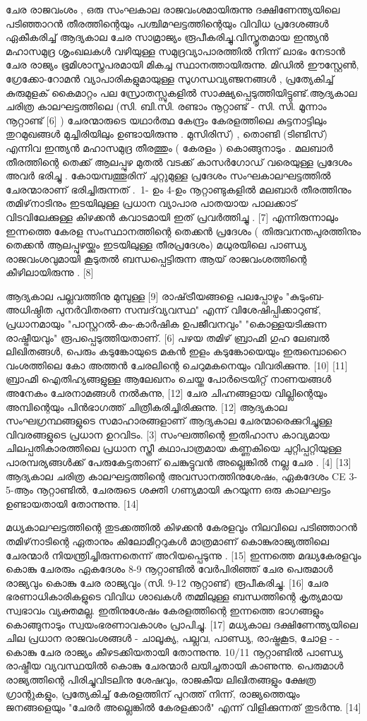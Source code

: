 \documentclass[a4paper,12pt,oneside,final]{article}
\begin{document}
ചേര രാജവംശം , ഒരു സംഘകാല രാജവംശമായിരുന്നു ദക്ഷിണേന്ത്യയിലെ പടിഞ്ഞാറൻ തീരത്തിന്റെയും പശ്ചിമഘട്ടത്തിന്റെയും വിവിധ പ്രദേശങ്ങൾ ഏകീകരിച്ച് ആദ്യകാല ചേര സാമ്രാജ്യം രൂപീകരിച്ചു.വിസ്തൃതമായ ഇന്ത്യൻ മഹാസമുദ്ര ശൃംഖലകൾ വഴിയുള്ള സമുദ്രവ്യാപാരത്തിൽ നിന്ന് ലാഭം നേടാൻ ചേര രാജ്യം ഭൂമിശാസ്ത്രപരമായി മികച്ച സ്ഥാനത്തായിരുന്നു. മിഡിൽ ഈസ്റ്റേൺ, ഗ്രേക്കോ-റോമൻ വ്യാപാരികളുമായുള്ള സുഗന്ധവ്യഞ്ജനങ്ങൾ , പ്രത്യേകിച്ച് കുരുമുളക് കൈമാറ്റം പല സ്രോതസ്സുകളിൽ സാക്ഷ്യപ്പെടുത്തിയിട്ടുണ്ട്.ആദ്യകാല ചരിത്ര കാലഘട്ടത്തിലെ (സി. ബി.സി. രണ്ടാം നൂറ്റാണ്ട് - സി. സി. മൂന്നാം നൂറ്റാണ്ട് [6] ) ചേരന്മാരുടെ യഥാർത്ഥ കേന്ദ്രം കേരളത്തിലെ കുട്ടനാട്ടിലും തുറമുഖങ്ങൾ മുച്ചിരിയിലും ഉണ്ടായിരുന്നു . മുസിരിസ്) , തൊണ്ടി (ടിണ്ടിസ്) എന്നിവ ഇന്ത്യൻ മഹാസമുദ്ര തീരത്തും ( കേരളം ) കൊങ്ങുനാടും . മലബാർ തീരത്തിന്റെ തെക്ക് ആലപ്പുഴ മുതൽ വടക്ക് കാസർഗോഡ് വരെയുള്ള പ്രദേശം അവർ ഭരിച്ചു . കോയമ്പത്തൂരിന് ചുറ്റുമുള്ള പ്രദേശം സംഘകാലഘട്ടത്തിൽ ചേരന്മാരാണ് ഭരിച്ചിരുന്നത് .  1- ഉം 4-ഉം നൂറ്റാണ്ടുകളിൽ മലബാർ തീരത്തിനും തമിഴ്‌നാടിനും ഇടയിലുള്ള പ്രധാന വ്യാപാര
പാതയായ പാലക്കാട് വിടവിലേക്കുള്ള കിഴക്കൻ കവാടമായി ഇത് പ്രവർത്തിച്ചു . [7] എന്നിരുന്നാലും ഇന്നത്തെ കേരള സംസ്ഥാനത്തിന്റെ തെക്കൻ
പ്രദേശം ( തിരുവനന്തപുരത്തിനും തെക്കൻ ആലപ്പുഴയ്ക്കും ഇടയിലുള്ള തീരപ്രദേശം) മധുരയിലെ പാണ്ഡ്യ രാജവംശവുമായി കൂടുതൽ ബന്ധപ്പെട്ടിരുന്ന ആയ്
രാജവംശത്തിന്റെ കീഴിലായിരുന്നു . [8]

ആദ്യകാല പല്ലവത്തിനു മുമ്പുള്ള [9] രാഷ്‌ട്രീയങ്ങളെ പലപ്പോഴും "കുടുംബ-അധിഷ്ഠിത പുനർവിതരണ സമ്പദ്‌വ്യവസ്ഥ" എന്ന് വിശേഷിപ്പിക്കാറുണ്ട്, പ്രധാനമായും "പാസ്റ്ററൽ-കം-കാർഷിക ഉപജീവനവും" "കൊള്ളയടിക്കുന്ന രാഷ്ട്രീയവും" രൂപപ്പെടുത്തിയതാണ്. [6] പഴയ തമിഴ് ബ്രാഹ്മി ഗുഹ ലേബൽ ലിഖിതങ്ങൾ, പെരും കടുങ്കോയുടെ മകൻ ഇളം കടുങ്കോയെയും ഇരുമ്പൊറൈ വംശത്തിലെ കോ അത്തൻ ചേരലിന്റെ ചെറുമകനെയും വിവരിക്കുന്നു. [10] [11] ബ്രാഹ്മി ഐതിഹ്യങ്ങളുള്ള ആലേഖനം ചെയ്ത പോർട്രെയിറ്റ് നാണയങ്ങൾ അനേകം ചേരനാമങ്ങൾ നൽകുന്നു, [12] ചേര ചിഹ്നങ്ങളായ വില്ലിന്റെയും അമ്പിന്റെയും പിൻഭാഗത്ത് ചിത്രീകരിച്ചിരിക്കുന്നു. [12] ആദ്യകാല സംഘഗ്രന്ഥങ്ങളുടെ സമാഹാരങ്ങളാണ് ആദ്യകാല ചേരന്മാരെക്കുറിച്ചുള്ള വിവരങ്ങളുടെ പ്രധാന ഉറവിടം. [3] സംഘത്തിന്റെ ഇതിഹാസ കാവ്യമായ ചിലപ്പതികാരത്തിലെ പ്രധാന സ്ത്രീ കഥാപാത്രമായ കണ്ണകിയെ ചുറ്റിപ്പറ്റിയുള്ള പാരമ്പര്യങ്ങൾക്ക് പേരുകേട്ടതാണ് ചെങ്കുട്ടുവൻ അല്ലെങ്കിൽ നല്ല ചേര . [4] [13] ആദ്യകാല ചരിത്ര കാലഘട്ടത്തിന്റെ അവസാനത്തിനുശേഷം, ഏകദേശം CE 3-5-ആം നൂറ്റാണ്ടിൽ, ചേരരുടെ ശക്തി ഗണ്യമായി കുറയുന്ന ഒരു കാലഘട്ടം ഉണ്ടായതായി തോന്നുന്നു. [14]

മധ്യകാലഘട്ടത്തിന്റെ തുടക്കത്തിൽ കിഴക്കൻ കേരളവും നിലവിലെ പടിഞ്ഞാറൻ തമിഴ്‌നാടിന്റെ ഏതാനും കിലോമീറ്ററുകൾ മാത്രമാണ് കൊങ്കുരാജ്യത്തിലെ ചേരന്മാർ നിയന്ത്രിച്ചിരുന്നതെന്ന് അറിയപ്പെടുന്നു . [15] ഇന്നത്തെ മദ്ധ്യകേരളവും കൊങ്കു ചേരരും ഏകദേശം 8-9 നൂറ്റാണ്ടിൽ വേർപിരിഞ്ഞ് ചേര പെരുമാൾ രാജ്യവും കൊങ്കു ചേര രാജ്യവും (സി. 9-12 നൂറ്റാണ്ട്) രൂപീകരിച്ചു. [16] ചേര ഭരണാധികാരികളുടെ വിവിധ ശാഖകൾ തമ്മിലുള്ള ബന്ധത്തിന്റെ കൃത്യമായ സ്വഭാവം വ്യക്തമല്ല. ഇതിനുശേഷം കേരളത്തിന്റെ ഇന്നത്തെ ഭാഗങ്ങളും കൊങ്ങുനാടും സ്വയംഭരണാവകാശം പ്രാപിച്ചു. [17] മധ്യകാല ദക്ഷിണേന്ത്യയിലെ ചില പ്രധാന രാജവംശങ്ങൾ - ചാലൂക്യ, പല്ലവ, പാണ്ഡ്യ, രാഷ്ട്രകൂട, ചോള - - കൊങ്കു ചേര രാജ്യം കീഴടക്കിയതായി തോന്നുന്നു. 10/11 നൂറ്റാണ്ടിൽ പാണ്ഡ്യ രാഷ്ട്രീയ വ്യവസ്ഥയിൽ കൊങ്കു ചേരന്മാർ ലയിച്ചതായി കാണുന്നു. പെരുമാൾ രാജ്യത്തിന്റെ പിരിച്ചുവിടലിനു ശേഷവും, രാജകീയ ലിഖിതങ്ങളും ക്ഷേത്ര ഗ്രാന്റുകളും, പ്രത്യേകിച്ച് കേരളത്തിന് പുറത്ത് നിന്ന്, രാജ്യത്തെയും ജനങ്ങളെയും "ചേരർ അല്ലെങ്കിൽ കേരളക്കാർ" എന്ന് വിളിക്കുന്നത് തുടർന്നു. [14]
\end{document}
